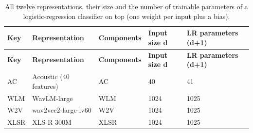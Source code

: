 \documentclass[11pt,a4paper]{article}
\begin{document}
\begin{center}\small\renewcommand{\arraystretch}{1.15}
\begin{longtable}{>{\raggedright\arraybackslash}p{2.88cm}>{\raggedright\arraybackslash}p{2.88cm}>{\raggedright\arraybackslash}p{2.88cm}>{\raggedright\arraybackslash}p{2.88cm}>{\raggedleft\arraybackslash}p{2.88cm}}
\caption{All twelve representations, their size and the number of trainable parameters of a logistic-regression classifier on top (one weight per input plus a bias).}\\
\toprule
\textbf{\hspace{0pt}Key} & \textbf{\hspace{0pt}Representation} & \textbf{\hspace{0pt}Components} & \textbf{\hspace{0pt}Input size d} & \textbf{\hspace{0pt}LR parameters (d+\allowbreak{}1)}\\\midrule\endfirsthead
\toprule
\textbf{\hspace{0pt}Key} & \textbf{\hspace{0pt}Representation} & \textbf{\hspace{0pt}Components} & \textbf{\hspace{0pt}Input size d} & \textbf{\hspace{0pt}LR parameters (d+\allowbreak{}1)}\\\midrule\endhead
\bottomrule\endfoot
\hspace{0pt}AC & \hspace{0pt}Acoustic (40 features) & \hspace{0pt}AC & \hspace{0pt}40 & \hspace{0pt}41\\
\hspace{0pt}WLM & \hspace{0pt}WavLM-large & \hspace{0pt}WLM & \hspace{0pt}1024 & \hspace{0pt}1025\\
\hspace{0pt}W2V & \hspace{0pt}wav2vec2-large-lv60 & \hspace{0pt}W2V & \hspace{0pt}1024 & \hspace{0pt}1025\\
\hspace{0pt}XLSR & \hspace{0pt}XLS-R 300M & \hspace{0pt}XLSR & \hspace{0pt}1024 & \hspace{0pt}1025\\

\end{longtable}
\end{center}
\end{document}
